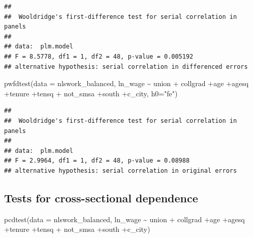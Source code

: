 \documentclass[
]{article}
\newenvironment{Shaded}{\begin{snugshade}}{\end{snugshade}}
\newcommand{\AttributeTok}[1]{\textcolor[rgb]{0.77,0.63,0.00}{#1}}
\newcommand{\FunctionTok}[1]{\textcolor[rgb]{0.00,0.00,0.00}{#1}}
\newcommand{\NormalTok}[1]{#1}
\newcommand{\SpecialCharTok}[1]{\textcolor[rgb]{0.00,0.00,0.00}{#1}}
\newcommand{\StringTok}[1]{\textcolor[rgb]{0.31,0.60,0.02}{#1}}
\begin{document}
\begin{verbatim}
## 
##  Wooldridge's first-difference test for serial correlation in panels
## 
## data:  plm.model
## F = 8.5778, df1 = 1, df2 = 48, p-value = 0.005192
## alternative hypothesis: serial correlation in differenced errors
\end{verbatim}

\begin{Shaded}
\begin{Highlighting}[]
  \FunctionTok{pwfdtest}\NormalTok{(}\AttributeTok{data =}\NormalTok{ nlswork\_balanced, ln\_wage }\SpecialCharTok{\textasciitilde{}}\NormalTok{ union }\SpecialCharTok{+}
\NormalTok{             collgrad }\SpecialCharTok{+}\NormalTok{age }\SpecialCharTok{+}\NormalTok{agesq }\SpecialCharTok{+}\NormalTok{tenure }\SpecialCharTok{+}\NormalTok{tensq }\SpecialCharTok{+}
\NormalTok{             not\_smsa }\SpecialCharTok{+}\NormalTok{south }\SpecialCharTok{+}\NormalTok{c\_city, }\AttributeTok{h0=}\StringTok{"fe"}\NormalTok{)}
\end{Highlighting}
\end{Shaded}

\begin{verbatim}
## 
##  Wooldridge's first-difference test for serial correlation in panels
## 
## data:  plm.model
## F = 2.9964, df1 = 1, df2 = 48, p-value = 0.08988
## alternative hypothesis: serial correlation in original errors
\end{verbatim}

\hypertarget{tests-for-cross-sectional-dependence}{%
\subsection{Tests for cross-sectional
dependence}\label{tests-for-cross-sectional-dependence}}

\begin{Shaded}
\begin{Highlighting}[]
  \FunctionTok{pcdtest}\NormalTok{(}\AttributeTok{data =}\NormalTok{ nlswork\_balanced, ln\_wage }\SpecialCharTok{\textasciitilde{}}\NormalTok{ union }\SpecialCharTok{+}
\NormalTok{            collgrad }\SpecialCharTok{+}\NormalTok{age }\SpecialCharTok{+}\NormalTok{agesq }\SpecialCharTok{+}\NormalTok{tenure }\SpecialCharTok{+}\NormalTok{tensq }\SpecialCharTok{+}
\NormalTok{            not\_smsa }\SpecialCharTok{+}\NormalTok{south }\SpecialCharTok{+}\NormalTok{c\_city)}
\end{Highlighting}
\end{Shaded}
\end{document}
